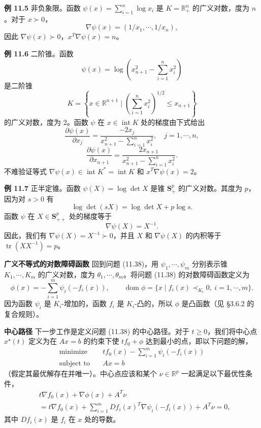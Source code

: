 \documentclass[UTF8,12pt,a4paper,fontset=fandol]{ctexart}
\begin{document}
\noindent\textbf{例 11.5}\quad
非负象限。函数 $\psi(x)=\sum_{i=1}^n\log x_i$ 是 $K=\mathbb{R}_+^n$ 的广义对数，度为 $n$。对于 $x\succ 0$，
\[
\nabla\psi(x)=(1/x_1,\cdots,1/x_n),
\]
因此 $\nabla\psi(x)\succ 0$，$x^T\nabla\psi(x)=n$。

\noindent\textbf{例 11.6}\quad
二阶锥。函数
\[
\psi(x)=\log\left(x_{n+1}^2-\sum_{i=1}^n x_i^2\right)
\]
是二阶锥
\[
K=\left\{x\in\mathbb{R}^{n+1}\mid \left(\sum_{i=1}^n x_i^2\right)^{1/2}\leq x_{n+1}\right\}
\]
的广义对数，度为 2。函数 $\psi$ 在 $x\in\operatorname{int}K$ 处的梯度由下式给出
\[
\frac{\partial\psi(x)}{\partial x_j}=
\frac{-2x_j}{x_{n+1}^2-\sum_{i=1}^n x_i^2},\quad j=1,\cdots,n,
\]
\[
\frac{\partial\psi(x)}{\partial x_{n+1}}=
\frac{2x_{n+1}}{x_{n+1}^2-\sum_{i=1}^n x_i^2}.
\]
不难验证等式 $\nabla\psi(x)\in\operatorname{int}K^\ast=\operatorname{int}K$ 和 $x^T\nabla\psi(x)=2$。

\noindent\textbf{例 11.7}\quad
正半定锥。函数 $\psi(X)=\log\det X$ 是锥 $\mathbf{S}_+^p$ 的广义对数。其度为 $p$，因为对 $s>0$ 有
\[
\log\det(sX)=\log\det X+p\log s.
\]
函数 $\psi$ 在 $X\in\mathbf{S}_{++}^p$ 处的梯度等于
\[
\nabla\psi(X)=X^{-1}.
\]
因此，我们有 $\nabla\psi(X)=X^{-1}\succ 0$，并且 $X$ 和 $\nabla\psi(X)$ 的内积等于 $\operatorname{tr}(XX^{-1})=p$。

\noindent\textbf{广义不等式的对数障碍函数}\quad
回到问题 (11.38)，用 $\psi_1,\cdots,\psi_m$ 分别表示锥 $K_1,\cdots,K_m$ 的广义对数，度为 $\theta_1,\cdots,\theta_m$。将问题 (11.38) 的对数障碍函数定义为
\[
\phi(x)=-\sum_{i=1}^m\psi_i(-f_i(x)),\qquad
\operatorname{dom}\phi=\{x\mid f_i(x)\prec_{K_i}0,\ i=1,\cdots,m\}.
\]
因为函数 $\psi_i$ 是 $K_i$-增加的，函数 $f_i$ 是 $K_i$-凸的，所以 $\phi$ 是凸函数（见 \S3.6.2 的复合规则）。

\noindent\textbf{中心路径}\quad
下一步工作是定义问题 (11.38) 的中心路径。对于 $t\geq 0$，我们将中心点 $x^\star(t)$ 定义为在 $Ax=b$ 的约束下使 $tf_0+\phi$ 达到最小的点，即以下问题的解，
\[
\begin{aligned}
\text{minimize}\quad & tf_0(x)-\sum_{i=1}^m\psi_i(-f_i(x))\\
\text{subject to}\quad & Ax=b
\end{aligned}
\]
（假定其最优解存在并唯一）。中心点应该和某个 $\nu\in\mathbb{R}^p$ 一起满足以下最优性条件，
\begin{equation}
\begin{aligned}
&t\nabla f_0(x)+\nabla\phi(x)+A^T\nu\\
&=t\nabla f_0(x)+\sum_{i=1}^m Df_i(x)^T\nabla\psi_i(-f_i(x))+A^T\nu=0,
\end{aligned}
\tag{11.41}
\end{equation}
其中 $Df_i(x)$ 是 $f_i$ 在 $x$ 处的导数。
\end{document}
